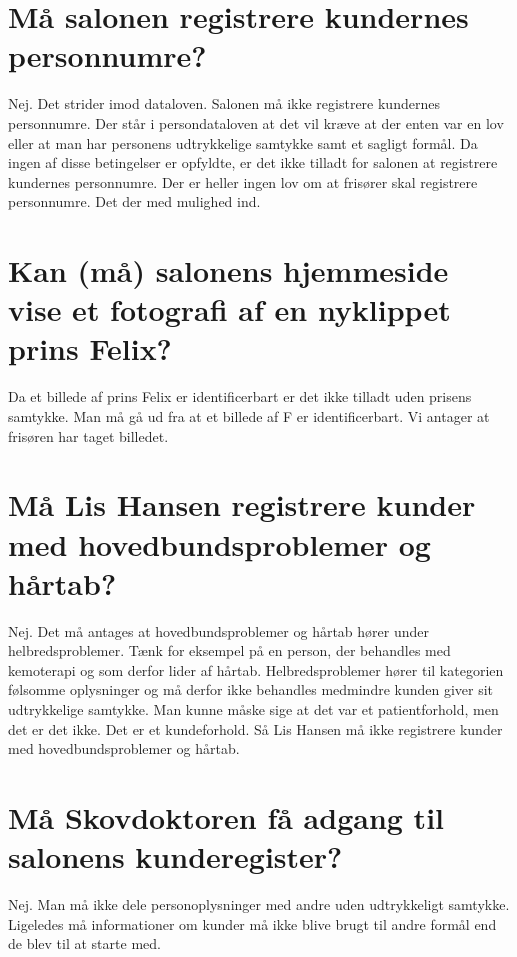 \documentclass{article}
\author{Mikkel K. Mathiesen, Jannik Gram, Rune \& Rasmus Abrahams{\tt (so|e)}n}
\title{}
\date{\today}
\begin{document}
\maketitle

\section{Må salonen registrere kundernes personnumre?}
Nej. Det strider imod dataloven. Salonen må ikke registrere kundernes personnumre. Der står i persondataloven at det vil kræve at der enten var en lov eller at man har personens udtrykkelige samtykke samt et sagligt formål. Da ingen af disse betingelser er opfyldte, er det ikke tilladt for salonen at registrere kundernes personnumre.
Der er heller ingen lov om at frisører skal registrere personnumre. Det der med mulighed ind.


\section{Kan (må) salonens hjemmeside vise et fotografi af en nyklippet prins Felix?}
Da et billede af prins Felix er identificerbart er det ikke tilladt uden prisens samtykke.
Man må gå ud fra at et billede af F er identificerbart.
Vi antager at frisøren har taget billedet.

\section{Må Lis Hansen registrere kunder med hovedbundsproblemer og hårtab?}
Nej. Det må antages at hovedbundsproblemer og hårtab hører under helbredsproblemer. Tænk for eksempel på en person, der behandles med kemoterapi og som derfor lider af hårtab.
Helbredsproblemer hører til kategorien følsomme oplysninger og må derfor ikke behandles medmindre kunden giver sit udtrykkelige samtykke.
Man kunne måske sige at det var et patientforhold, men det er det ikke. Det er et kundeforhold.
Så Lis Hansen må ikke registrere kunder med hovedbundsproblemer og hårtab.

\section{Må Skovdoktoren få adgang til salonens kunderegister?}
Nej. Man må ikke dele personoplysninger med andre uden udtrykkeligt samtykke.
Ligeledes må informationer om kunder må ikke blive brugt til andre formål end de blev til at starte med.
\end{document}
